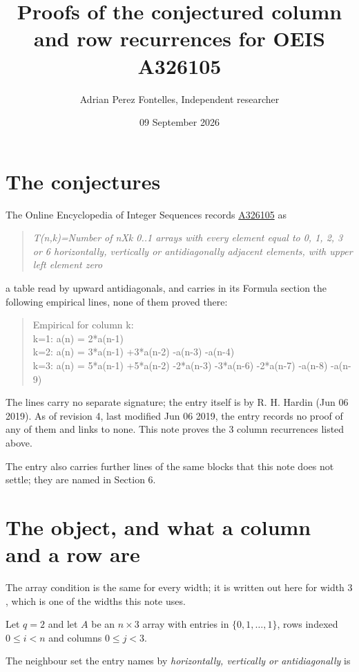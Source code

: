 \documentclass[11pt]{article}
\title{Proofs of the conjectured column and row recurrences for OEIS A326105}
\author{Adrian Perez Fontelles, Independent researcher}
\date{09 September 2026}
\theoremstyle{definition}
\begin{document}
\maketitle
\section{The conjectures}

The Online Encyclopedia of Integer Sequences records \href{https://oeis.org/A326105}{A326105} as

\begin{quote}\itshape T(n,k)=Number of nXk 0..1 arrays with every element equal to 0, 1, 2, 3 or 6 horizontally, vertically or antidiagonally adjacent elements, with upper left element zero\end{quote}

a table read by upward antidiagonals, and carries in its Formula section the following empirical lines, none of them proved there:

\begin{quote}\ttfamily Empirical for column k:\\
k=1: a(n) = 2*a(n-1)\\k=2: a(n) = 3*a(n-1) +3*a(n-2) -a(n-3) -a(n-4)\\k=3: a(n) = 5*a(n-1) +5*a(n-2) -2*a(n-3) -3*a(n-6) -2*a(n-7) -a(n-8) -a(n-9)\end{quote}

The lines carry no separate signature; the entry itself is by R. H. Hardin (Jun 06 2019). As of revision 4, last modified Jun 06 2019, the entry records no proof of any of them and links to none. This note proves the 3 column recurrences listed above.

The entry also carries further lines of the same blocks that this note does not settle; they are named in Section 6.

\section{The object, and what a column and a row are}

The array condition is the same for every width; it is written out here for width $3$, which is one of the widths this note uses.

Let $q = 2$ and let $A$ be an $n \times 3$ array with entries in $\{0,1,\dots,1\}$, rows indexed $0 \le i < n$ and columns $0 \le j < 3$.

The neighbour set the entry names by {\itshape horizontally, vertically or antidiagonally} is
\end{document}
